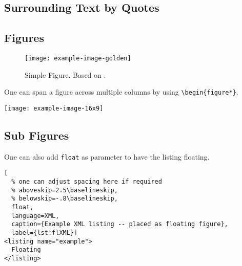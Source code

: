 \documentclass[peerreview,a4paper,english]{IEEEtran}[2015/08/26]
\begin{document}
\subsection{Surrounding Text by Quotes}
\begin{ltgexample}
\end{ltgexample}
\subsection{Figures}
\begin{ltgexample}
\begin{figure}
  \centering
  \texttt{[image: example-image-golden]}
  \caption[Simple Figure]{Simple Figure. Based on \citet{mwe}.}
  \label{fig:label}
\end{figure}
\end{ltgexample}
One can span a figure across multiple columns by using \verb+\begin{figure*}+.
\begin{ltgexample}
\begin{figure*}
  \centering
  \texttt{[image: example-image-16x9]}
  \caption{16x9 Figure}
  \label{fig:16x9}
\end{figure*}
\end{ltgexample}
\subsection{Sub Figures}
\begin{ltgexample}
\begin{figure*}[!b]
    \centering
  \hfil
  \caption{Example figure with two sub figures.}
  \label{fig:two_sub_figures}
\end{figure*}
\end{ltgexample}
One can also add \verb+float+ as parameter to have the listing floating.
\begin{ltgexample}
\begin{lstlisting}[
  % one can adjust spacing here if required
  % aboveskip=2.5\baselineskip,
  % belowskip=-.8\baselineskip,
  float,
  language=XML,
  caption={Example XML listing -- placed as floating figure},
  label={lst:flXML}]
<listing name="example">
  Floating
</listing>
\end{lstlisting}
\end{ltgexample}
\end{document}

